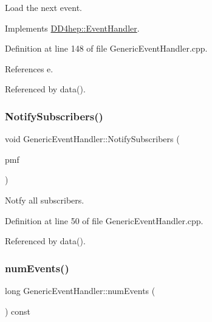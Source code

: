 Load the next event. 



Implements \hyperlink{class_d_d4hep_1_1_event_handler_ac2360791d3a44f4cef0987f9a7ec51ce}{D\+D4hep\+::\+Event\+Handler}.



Definition at line 148 of file Generic\+Event\+Handler.\+cpp.



References e.



Referenced by data().

\hypertarget{class_d_d4hep_1_1_generic_event_handler_a01e7a0bdb965b93d5a3b0ba8f9ccb85e}{}\label{class_d_d4hep_1_1_generic_event_handler_a01e7a0bdb965b93d5a3b0ba8f9ccb85e} 
\subsubsection{\texorpdfstring{Notify\+Subscribers()}{NotifySubscribers()}}
{\footnotesize\ttfamily void Generic\+Event\+Handler\+::\+Notify\+Subscribers (\begin{DoxyParamCaption}\item[{void(Event\+Consumer\+::$\ast$)(\hyperlink{class_d_d4hep_1_1_event_handler}{Event\+Handler} $\ast$)}]{pmf }\end{DoxyParamCaption})\hspace{0.3cm}{\ttfamily [virtual]}}



Notfy all subscribers. 



Definition at line 50 of file Generic\+Event\+Handler.\+cpp.



Referenced by data().

\hypertarget{class_d_d4hep_1_1_generic_event_handler_a05d0623b58211c6d941aea1377771a2b}{}\label{class_d_d4hep_1_1_generic_event_handler_a05d0623b58211c6d941aea1377771a2b} 
\subsubsection{\texorpdfstring{num\+Events()}{numEvents()}}
{\footnotesize\ttfamily long Generic\+Event\+Handler\+::num\+Events (\begin{DoxyParamCaption}{ }\end{DoxyParamCaption}) const\hspace{0.3cm}{\ttfamily [virtual]}}



